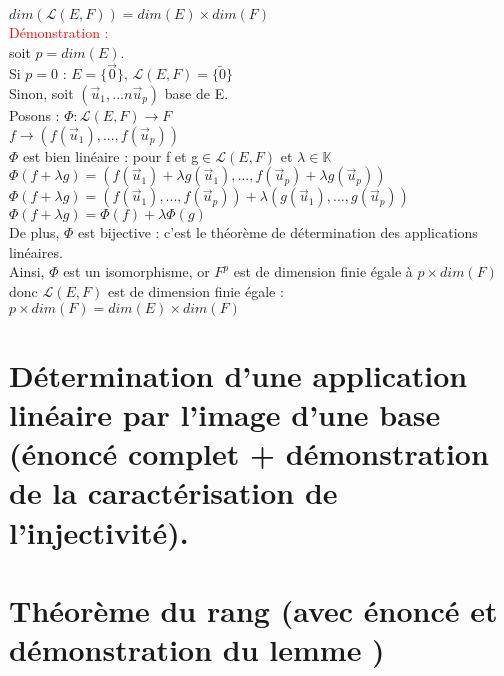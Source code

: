 \documentclass{article}
\begin{document}
$dim(\mathcal L(E,F))= dim(E) \times dim(F)$ \\
\textcolor{red}{Démonstration :} \\
soit $p=dim(E)$. \\
Si $p=0$ : $E= \lbrace \vec 0 \rbrace$, $\mathcal L (E,F)= \lbrace \tilde{0} \rbrace$ \\
Sinon,  soit $(\vec u_1,...n  \vec u_p)$ base de E. \\
Posons : $\Phi : \mathcal L(E,F) \rightarrow F$ \\
$f \rightarrow (f(\vec u_1),...,f(\vec u_p))$ \\
$\Phi$ est bien linéaire : pour f et g$\in \mathcal L (E,F)$ et $\lambda \in \mathbb K$ \\
$\Phi (f+ \lambda g)= (f( \vec u_1)+ \lambda g(\vec u_1),...,f(\vec u_p)+ \lambda g(\vec u_p))$ \\
$\Phi (f+ \lambda g)= (f(\vec u_1),...,f(\vec u_p)) + \lambda (g(\vec u_1),...,g(\vec u_p))$ \\
$\Phi (f+ \lambda g)= \Phi (f) + \lambda \Phi(g)$ \\
De plus, $\Phi$ est bijective : c'est le théorème de détermination des applications linéaires. \\
Ainsi, $\Phi$ est un isomorphisme, or $F^p$ est de dimension finie égale à $p \times dim(F)$ donc $\mathcal L (E,F)$ est de dimension finie égale : $p \times dim(F)= dim(E) \times dim(F)$
\section{Détermination d'une application linéaire par l'image d'une base (énoncé complet + démonstration de la caractérisation de l'injectivité).}
\section{Théorème du rang (avec énoncé et démonstration du lemme )}
\end{document}
